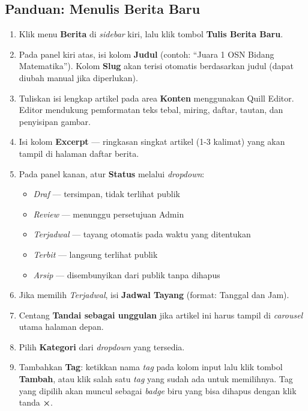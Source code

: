 \subsection{Panduan: Menulis Berita Baru}

\begin{enumerate}
  \item Klik menu \textbf{Berita} di \textit{sidebar} kiri, lalu klik tombol \textbf{Tulis Berita Baru}.
  \item Pada panel kiri atas, isi kolom \textbf{Judul} (contoh: ``Juara 1 OSN Bidang Matematika'').
        Kolom \textbf{Slug} akan terisi otomatis berdasarkan judul (dapat diubah manual jika diperlukan).
  \item Tuliskan isi lengkap artikel pada area \textbf{Konten} menggunakan Quill Editor.
        Editor mendukung pemformatan teks tebal, miring, daftar, tautan, dan penyisipan gambar.
  \item Isi kolom \textbf{Excerpt} --- ringkasan singkat artikel (1-3 kalimat) yang
        akan tampil di halaman daftar berita.
  \item Pada panel kanan, atur \textbf{Status} melalui \textit{dropdown}:
        \begin{itemize}
          \item \textit{Draf} --- tersimpan, tidak terlihat publik
          \item \textit{Review} --- menunggu persetujuan Admin
          \item \textit{Terjadwal} --- tayang otomatis pada waktu yang ditentukan
          \item \textit{Terbit} --- langsung terlihat publik
          \item \textit{Arsip} --- disembunyikan dari publik tanpa dihapus
        \end{itemize}
  \item Jika memilih \textit{Terjadwal}, isi \textbf{Jadwal Tayang} (format: Tanggal dan Jam).
  \item Centang \textbf{Tandai sebagai unggulan} jika artikel ini harus tampil di
        \textit{carousel} utama halaman depan.
  \item Pilih \textbf{Kategori} dari \textit{dropdown} yang tersedia.
  \item Tambahkan \textbf{Tag}: ketikkan nama \textit{tag} pada kolom input lalu klik tombol \textbf{Tambah},
        atau klik salah satu \textit{tag} yang sudah ada untuk memilihnya. Tag yang dipilih akan muncul
        sebagai \textit{badge} biru yang bisa dihapus dengan klik tanda \textbf{×}.

\end{enumerate}
